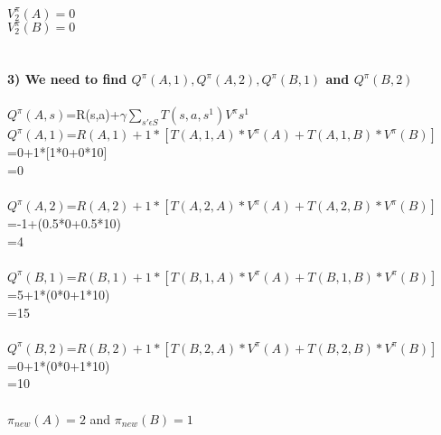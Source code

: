 \documentclass[11pt,a4paper]{article}
\begin{document}
$V_{2}^{\pi}(A)=0$\\
$V_{2}^{\pi}(B)=0$\\\\\\
\textbf{3) We need to find $Q^{\pi }(A,1), Q^{\pi }(A,2), Q^{\pi }(B,1)$ and $Q^{\pi }(B,2)$}\\\\
 $Q^{\pi }(A,s)$=R(s,a)+$\gamma \sum_{s' \epsilon S}T(s,a,s^{1})V^{\pi}s^{1}$\\
 $Q^{\pi }(A,1)$=$R(A,1)+1*[T(A,1,A)*V^{\pi}(A)+T(A,1,B)*V^{\pi}(B)]$\\
=0+1*[1*0+0*10]\\
=0\\\\
$Q^{\pi}(A,2)$=$R(A,2)+1*[T(A,2,A)*V^{\pi}(A)+T(A,2,B)*V^{\pi}(B)]$\\
=-1+(0.5*0+0.5*10)\\
=4\\\\
$Q^{\pi }(B,1)$=$R(B,1)+1*[T(B,1,A)*V^{\pi}(A)+T(B,1,B)*V^{\pi}(B)]$\\
=5+1*(0*0+1*10)\\
=15\\\\
$Q^{\pi }(B,2)$=$R(B,2)+1*[T(B,2,A)*V^{\pi}(A)+T(B,2,B)*V^{\pi}(B)]$\\
=0+1*(0*0+1*10)\\
=10\\\\
$\pi_{new}(A)=2$  and
$\pi_{new}(B)=1$
\end{document}
